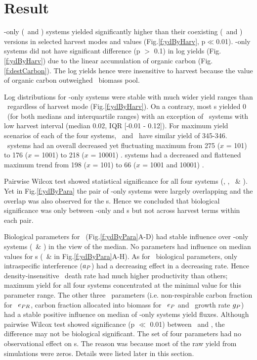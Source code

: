 \documentclass[../thesis.tex]{subfiles} %
\begin{document}
\section{Result}
\Phy-only (\PoH\ and \PoN) systems yielded significantly higher than their coexisting (\PBH\ and \PBN) versions in selected harvest modes and values (Fig.\ref{f:ydByHarv}, p$\ll$0.01).  \Phy-only systems did not have significant difference (p $>$ 0.1) in log yields (Fig.\ref{f:ydByHarv}) due to the linear accumulation of organic carbon (Fig.\ref{f:destCarbon}).  The log yields hence were insensitive to harvest because the value of organic carbon outweighed \phy\ biomass pool.

Log distributions for \phy-only systems were stable with much wider yield ranges than \pbs\ regardless of harvest mode (Fig.\ref{f:ydByHarv}).  On a contrary, most \pbs s yielded 0 \dxdt\ (for both medians and interquartile ranges) with an exception of \PBN\ systems with low harvest interval (median 0.02, IQR [-0.01 - 0.12]\dxdt).  For maximum yield scenarios of each of the four systems, \PoH\ and \PoN\ have similar yield of 345-346\dxdt.  \PBH\ systems had an overall decreased yet fluctuating maximum from 275 ($x$ = 101) to 176 ($x$ = 1001) to 218 ($x$ = 10001) \dxdt.  \PBN systems had a decreased and flattened maximum trend from 198 ($x$ = 101) to 66 ($x$ = 1001 and 10001) \dxdt.

Pairwise Wilcox test showed statistical significance for all four systems (\PBH, \PoH, \PBN\ \& \PoN).  Yet in Fig.\ref{f:ydByPara} the pair of \phy-only systems were largely overlapping and the overlap was also observed for the \pbs s.  Hence we concluded that biological significance was only between \phy-only and \pbs s but not across harvest terms within each pair.

Biological parameters for \phy\ (Fig.\ref{f:ydByPara}A-D) had stable influence over \phy-only systems (\PoH\ \& \PoN) in the view of the median.  No parameters had influence on median values for \pbs s (\PBH\ \& \PBN in Fig.\ref{f:ydByPara}A-H).  As for \phy\ biological parameters, only intraspecific interference ($a_P$) had a decreasing effect in a decreasing rate.  Hence density-insensitive \phy\ death rate had much higher productivity than others; maximum yield for all four systems concentrated at the minimal value for this parameter range.  The other three \phy\ parameters (i.e. non-respirable carbon fraction for \phy\ $e_{PR}$, carbon fraction allocated into biomass for \phy\ $e_P$ and \phy\ growth rate $g_P$) had a stable positive influence on median of \phy-only systems yield fluxes.  Although pairwise Wilcox test showed significance (p $\ll$ 0.01) between \PoH\ and \PoN, the difference may not be biological significant.  The set of four parameters had no observational effect on \pbs s.  The reason was because most of the raw yield from simulations were zeros.  Details were listed later in this section.
\end{document}
